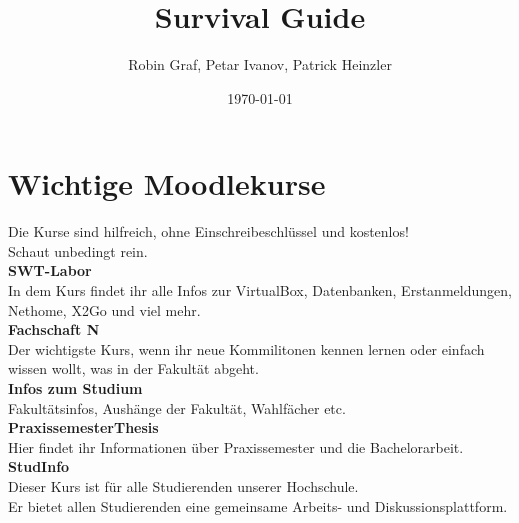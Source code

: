 \documentclass[11pt, a4paper, oneside]{book}
\author{Robin Graf, Petar Ivanov, Patrick Heinzler}
\title{Survival Guide}
\date{\today}
\begin{document}
    

\chapter{Wichtige Moodlekurse}

Die Kurse sind hilfreich, ohne Einschreibeschlüssel und kostenlos!\\
Schaut unbedingt rein.\\

\textbf{SWT-Labor}\\
In dem Kurs findet ihr alle Infos zur VirtualBox, Datenbanken, Erstanmeldungen, Nethome, X2Go und viel mehr.\\

\textbf{Fachschaft N}\\
Der wichtigste Kurs, wenn ihr neue Kommilitonen kennen lernen oder einfach wissen wollt, was in der Fakultät abgeht.\\

\textbf{Infos zum Studium}\\
Fakultätsinfos, Aushänge der Fakultät, Wahlfächer etc.\\ %

\textbf{PraxissemesterThesis}\\
Hier findet ihr Informationen über Praxissemester und die Bachelorarbeit.\\

\textbf{StudInfo}\\
Dieser Kurs ist für alle Studierenden unserer Hochschule.\\
Er bietet allen Studierenden eine gemeinsame Arbeits- und Diskussionsplattform.\\
\end{document}

